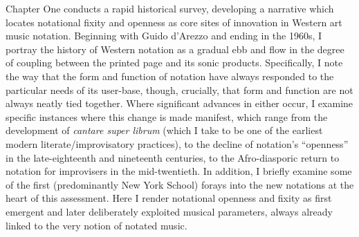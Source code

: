 Chapter One conducts a rapid historical survey, developing a narrative which locates notational fixity and openness as core sites of innovation in Western art music notation. 
Beginning with Guido d'Arezzo and ending in the 1960s, I portray the history of Western notation as a gradual ebb and flow in the degree of coupling between the printed page and its sonic products. 
Specifically, I note the way that the form and function of notation have always responded to the particular needs of its user-base, though, crucially, that form and function are not always neatly tied together.
Where significant advances in either occur, I examine specific instances where this change is made manifest, which range from the development of \textit{cantare super librum} (which I take to be one of the earliest modern literate/improvisatory practices), to the decline of notation's ``openness'' in the late-eighteenth and nineteenth centuries, to the Afro-diasporic return to notation for improvisers in the mid-twentieth.
In addition, I briefly examine some of the first (predominantly New York School) forays into the new notations at the heart of this assessment. 
Here I render notational openness and fixity as first emergent and later deliberately exploited musical parameters, always already linked to the very notion of notated music.


